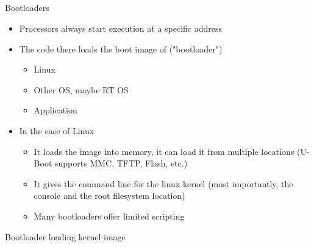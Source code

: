 \documentclass{workshop}
\begin{document}
\subsection{}
\begin{frame}{Bootloaders}
	\begin{itemize}
		\item Processors always start execution at a specific address
		\item The code there loads the boot image of ("bootloader")
			\begin{itemize}
				\item Linux
				\item Other OS, maybe RT OS
				\item Application
			\end{itemize}

		\item In the case of Linux
			\begin{itemize}
				\item It loads the image into memory, it can load it from multiple locations (U-Boot supports MMC, TFTP, Flash, etc.)
				\item It gives the command line for the linux kernel (most importantly, the console and the root filesystem location)
				\item Many bootloaders offer limited scripting 
			\end{itemize}
	\end{itemize}
\end{frame}

\begin{frame}{Bootloader loading kernel image}

\end{frame}
\end{document}

